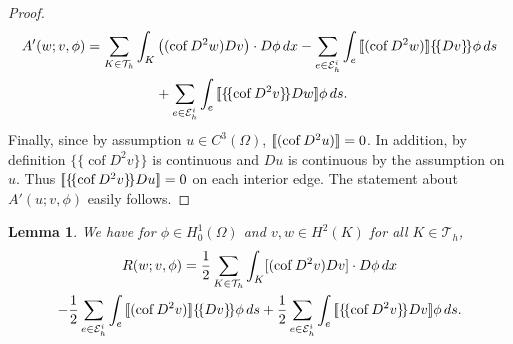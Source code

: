 \documentclass[12pt]{amsart}
\def \[{ \mbox{[ \hspace{-.5em}[}} %
\def \]{ \mbox{] \hspace{-.5em}]}}
\numberwithin{equation}{section}
\newcommand{\ud}{\,d}
\newcommand\cof{\operatorname{cof}}
\newtheorem{lemma}[thm]{Lemma}
\begin{document}
\begin{proof}
\begin{align*}
A'(w;v,\phi) &  = \sum_{K \in \mathcal{T}_h} \int_{K }\big( (\cof  D^2 w)  D v \big) \cdot D \phi \ud x - \sum_{e \in \mathcal{E}_h^i }
\int_e \[(\cof  D^2 w)\] \{\!\{D v\}\!\} \phi  \ud s \\\notag
& \qquad \qquad \quad  + \sum_{e \in \mathcal{E}_h^i } \int_e \[\{\!\{\cof D^2 v \}\!\} D w \] \phi
\ud s .
\end{align*}
Finally, since by assumption $u \in C^3(\Omega)$, $\[(\cof  D^2 u)\]=0$. In addition, by definition $\{\!\{\cof D^2 v \}\!\}$ is continuous and $Du$ is continuous by the assumption on $u$. Thus $\[\{\!\{\cof D^2 v \}\!\} D u \]=0$ on each interior edge. The statement about $A'(u;v,\phi)$ easily follows.
\end{proof}

\begin{lemma}
We have for $\phi \in H_0^{1}(\Omega)$ and $v, w \in H^2(K)$ for all $K \in \mathcal{T}_h$,
\begin{multline} \label{R1-simple}
R(w;v,\phi)  = \frac{1}{2} \sum_{K \in \mathcal{T}_h}  \int_K [(\cof D^2 v) D v ]  \cdot D \phi \ud x \\
-\frac{1}{2}  \sum_{e \in \mathcal{E}_h^i } \int_e \[(\cof D^2 v) \] \{\!\{ D v \}\!\} \phi \ud s 
 + \frac{1}{2} \sum_{e \in \mathcal{E}_h^i } \int_e \[ \{\!\{\cof D^2 v \}\!\} D v \] \phi\ud s.
\end{multline}
\end{lemma}
\end{document}

